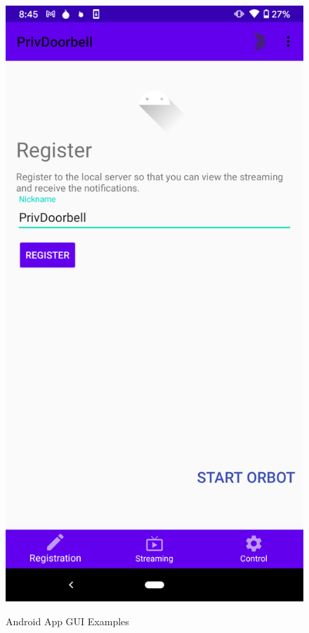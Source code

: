 \begin{figure}
	\caption{Android App GUI Examples}
	\begin{minipage}[t]{0.3\linewidth}
		\includegraphics[width=\linewidth]{app_sc_main.png}
		\label{fig:app_sc_main}	
	\end{minipage}

\end{figure}
